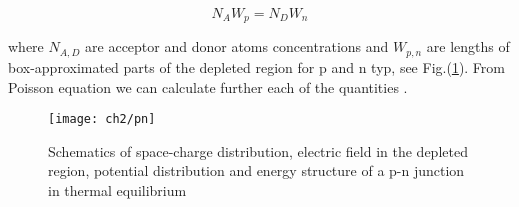 \begin{equation}
N_AW_p=N_DW_n
\end{equation}

where $N_{A,D}$ are acceptor and donor atoms concentrations and $W_{p,n}$ are lengths of box-approximated parts of the depleted region for p and n typ, see Fig.(\ref{fig:pn}). From Poisson equation we can calculate further each of the quantities \cite{sze}.

\begin{figure}
\centering
\texttt{[image: ch2/pn]}
\caption{Schematics of space-charge distribution, electric field in the depleted region, potential distribution and energy structure of a p-n junction in thermal equilibrium}
\label{fig:pn}
\end{figure}
